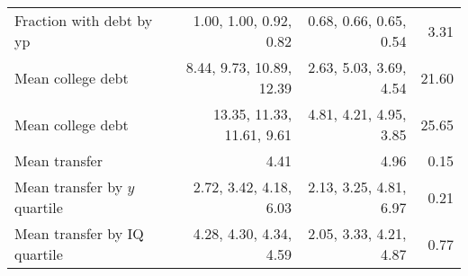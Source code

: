 \begin{tabular}{lrrr}
Fraction with debt by yp & 1.00, 1.00, 0.92, 0.82  & 0.68, 0.66, 0.65, 0.54  & 3.31  \\ 
Mean college debt & 8.44, 9.73, 10.89, 12.39  & 2.63, 5.03, 3.69, 4.54  & 21.60  \\ 
Mean college debt & 13.35, 11.33, 11.61, 9.61  & 4.81, 4.21, 4.95, 3.85  & 25.65  \\ 
Mean transfer & 4.41  & 4.96  & 0.15  \\ 
Mean transfer by $y$ quartile & 2.72, 3.42, 4.18, 6.03  & 2.13, 3.25, 4.81, 6.97  & 0.21  \\ 
Mean transfer by IQ quartile & 4.28, 4.30, 4.34, 4.59  & 2.05, 3.33, 4.21, 4.87  & 0.77  \\ 
\hline
\end{tabular}%
